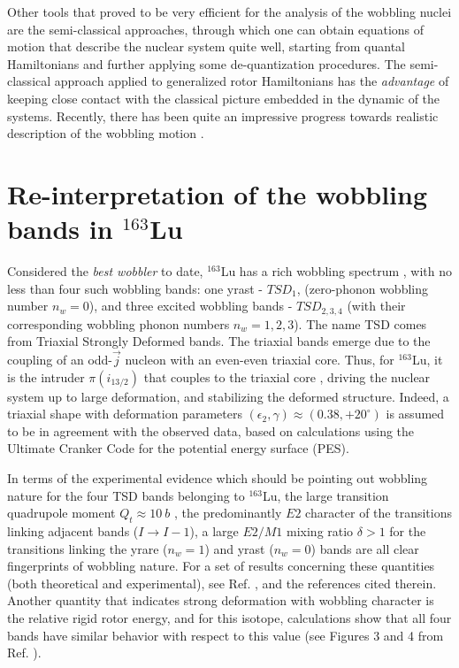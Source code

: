 \documentclass[11pt]{article}
\begin{document}
Other tools that proved to be very efficient for the analysis of the wobbling nuclei are the semi-classical approaches, through which one can obtain equations of motion that describe the nuclear system quite well, starting from quantal Hamiltonians and further applying some de-quantization procedures. The semi-classical approach applied to generalized rotor Hamiltonians has the \emph{advantage} of keeping close contact with the classical picture embedded in the dynamic of the systems. Recently, there has been quite an impressive progress towards realistic description of the wobbling motion \cite{raduta2007semiclassical,frauendorf2014transverse,raduta2017semiclassical,raduta2018wobbling,budaca2018tilted,raduta2020approach,raduta2020towards}.

\section{\texorpdfstring{Re-interpretation of the wobbling bands in $^{163}$Lu}%
                               {Re-interpretation of the wobbling bands structure for 163Lu}}
\label{section-reinterpretation}

Considered the \emph{best wobbler} to date, $^{163}$Lu has a rich wobbling spectrum \cite{odegaard2001evidence,jensen2002evidence}, with no less than four such wobbling bands: one yrast - $TSD_1$, (zero-phonon wobbling number $n_w=0$), and three excited wobbling bands - $TSD_{2,3,4}$ (with their corresponding wobbling phonon numbers $n_w=1,2,3$). The name TSD comes from Triaxial Strongly Deformed bands. The triaxial bands emerge due to the coupling of an odd-$\vec{j}$ nucleon with an even-even triaxial core. Thus, for $^{163}$Lu, it is the intruder $\pi(i_{13/2})$ that couples to the triaxial core \cite{odegaard2001evidence,hamamoto2002wobbling,jensen2002wobbling}, driving the nuclear system up to large deformation, and stabilizing the deformed structure. Indeed, a triaxial shape with deformation parameters $(\epsilon_2,\gamma)\approx(0.38,+20^\circ)$ is assumed to be in agreement with the observed data, based on calculations using the Ultimate Cranker Code \cite{bengtsson1990high} for the potential energy surface (PES).

In terms of the experimental evidence which should be pointing out wobbling nature for the four TSD bands belonging to $^{163}$Lu, the large transition quadrupole moment $Q_t \approx 10\ b$ \cite{gorgen2004quadrupole}, the predominantly $E2$ character of the transitions linking adjacent bands ($I\to I-1$), a large $E2/M1$ mixing ratio $\delta>1$ for the transitions linking the yrare ($n_w=1$) and yrast ($n_w=0$) bands are all clear fingerprints of wobbling nature. For a set of results concerning these quantities (both theoretical and experimental), see Ref. \cite{raduta2017semiclassical}, and the references cited therein. Another quantity that indicates strong deformation with wobbling character is the relative rigid rotor energy, and for this isotope, calculations show that all four bands have similar behavior with respect to this value (see Figures 3 and 4 from Ref. \cite{hagemann2005triaxiality}).
\end{document}
